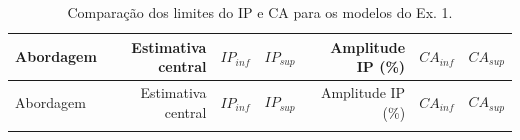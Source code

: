 \documentclass[
  a4paper, 11pt]{article}
\begin{document}
\begin{longtable}[]{@{}lrrrrrr@{}}
\caption{Comparação dos limites do IP e CA para os modelos do Ex.
1.}\tabularnewline
\toprule
\begin{minipage}[b]{0.06\columnwidth}\raggedright
Abordagem\strut
\end{minipage} & \begin{minipage}[b]{0.14\columnwidth}\raggedleft
Estimativa central\strut
\end{minipage} & \begin{minipage}[b]{0.14\columnwidth}\raggedleft
\(IP_{inf}\)\strut
\end{minipage} & \begin{minipage}[b]{0.15\columnwidth}\raggedleft
\(IP_{sup}\)\strut
\end{minipage} & \begin{minipage}[b]{0.10\columnwidth}\raggedleft
Amplitude IP (\%)\strut
\end{minipage} & \begin{minipage}[b]{0.11\columnwidth}\raggedleft
\(CA_{inf}\)\strut
\end{minipage} & \begin{minipage}[b]{0.11\columnwidth}\raggedleft
\(CA_{sup}\)\strut
\end{minipage}\tabularnewline
\midrule
\endfirsthead
\toprule
\begin{minipage}[b]{0.06\columnwidth}\raggedright
Abordagem\strut
\end{minipage} & \begin{minipage}[b]{0.14\columnwidth}\raggedleft
Estimativa central\strut
\end{minipage} & \begin{minipage}[b]{0.14\columnwidth}\raggedleft
\(IP_{inf}\)\strut
\end{minipage} & \begin{minipage}[b]{0.15\columnwidth}\raggedleft
\(IP_{sup}\)\strut
\end{minipage} & \begin{minipage}[b]{0.10\columnwidth}\raggedleft
Amplitude IP (\%)\strut
\end{minipage} & \begin{minipage}[b]{0.11\columnwidth}\raggedleft
\(CA_{inf}\)\strut
\end{minipage} & \begin{minipage}[b]{0.11\columnwidth}\raggedleft
\(CA_{sup}\)\strut
\end{minipage}\tabularnewline
\midrule
\endhead
\begin{minipage}[t]{0.06\columnwidth}\raggedright

\end{minipage}
\end{longtable}
\end{document}

